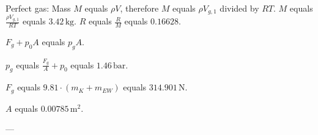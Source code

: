 Perfect gas:  
Mass \( M \) equals \( \rho V \), therefore \( M \) equals \( \rho V_{g,1} \) divided by \( RT \).  
\( M \) equals \( \frac{\rho V_{g,1}}{RT} \) equals \( 3.42 \, \text{kg} \).  
\( R \) equals \( \frac{R}{M} \) equals \( 0.16628 \).  

\( F_g + p_0 A \) equals \( p_g A \).  

\( p_g \) equals \( \frac{F_g}{A} + p_0 \) equals \( 1.46 \, \text{bar} \).  

\( F_g \) equals \( 9.81 \cdot (m_K + m_{EW}) \) equals \( 314.901 \, \text{N} \).  

\( A \) equals \( 0.00785 \, \text{m}^2 \).  

---